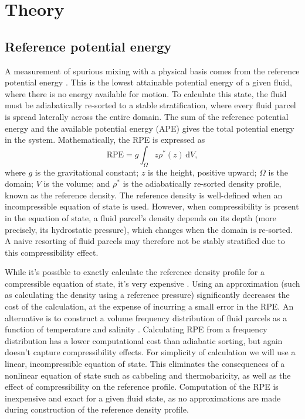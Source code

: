 \section{Theory}
\subsection{Reference potential energy}
A measurement of spurious mixing with a physical basis comes from the reference potential energy \citep[known also as background potential energy][]{winters95}. This is the lowest attainable potential energy of a given fluid, where there is no energy available for motion. To calculate this state, the fluid must be adiabatically re-sorted to a stable stratification, where every fluid parcel is spread laterally across the entire domain. The sum of the reference potential energy and the available potential energy (APE) gives the total potential energy in the system. Mathematically, the RPE is expressed as
%
\begin{equation}
  \mathrm{RPE} = g \int_\Omega z \rho^*(z)\,\mathrm dV,
\end{equation}
%
where $g$ is the gravitational constant; $z$ is the height, positive upward; $\Omega$ is the domain; $V$ is the volume; and $\rho^*$ is the adiabatically re-sorted density profile, known as the reference density. The reference density is well-defined when an incompressible equation of state is used. However, when compressibility is present in the equation of state, a fluid parcel's density depends on its depth (more precisely, its hydrostatic pressure), which changes when the domain is re-sorted. A naive resorting of fluid parcels may therefore not be stably stratified due to this compressibility effect.


While it's possible to exactly calculate the reference density profile for a compressible equation of state, it's very expensive \citep{ilicak12}. Using an approximation (such as calculating the density using a reference pressure) significantly decreases the cost of the calculation, at the expense of incurring a small error in the RPE. An alternative is to construct a volume frequency distribution of fluid parcels as a function of temperature and salinity \citep{saenz15}. Calculating RPE from a frequency distribution has a lower computational cost than adiabatic sorting, but again doesn't capture compressibility effects. For simplicity of calculation we will use a linear, incompressible equation of state. This eliminates the consequences of a nonlinear equation of state such as cabbeling and thermobaricity, as well as the effect of compressibility on the reference profile. Computation of the RPE is inexpensive and exact for a given fluid state, as no approximations are made during construction of the reference density profile.

